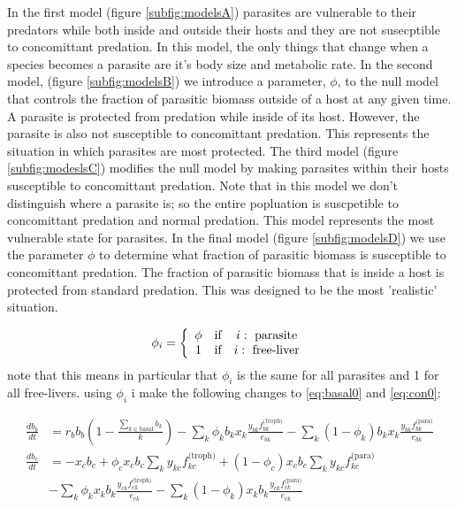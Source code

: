 \documentclass[11pt]{amsart}
\begin{document}
In the first model (figure \ref{subfig:modelsA}) parasites are vulnerable to their predators while both inside and outside their hosts and they are not susecptible to concomittant predation.  In this model, the only things that change when a species becomes a parasite are it's body size and metabolic rate.  In the second model, (figure \ref{subfig:modelsB})  we introduce a parameter, $\phi$, to the null model that controls the fraction of parasitic biomass outside of a host at any given time.  A parasite is protected from predation while inside of its host.  However, the parasite is also not susceptible to concomittant predation.  This represents the situation in which parasites are most protected.  The third model (figure \ref{subfig:modeslsC}) modifies the null model by making parasites within their hosts susceptible to concomittant predation.  Note that in this model we don't distinguish where a parasite is; so the entire popluation is suscpetible to concomittant predation and normal predation.  This model represents the most vulnerable state for parasites.  In the final model (figure \ref{subfig:modelsD}) we use the parameter $\phi$ to determine what fraction of parasitic biomass is susceptible to concomittant predation.  The fraction of parasitic biomass that is inside a host is protected from standard predation.  This was designed to be the most 'realistic' situation.


\begin{equation}
\phi_i = 
\left\{
\begin{array}{c c c}
\phi & \text{if} & i:\text{ parasite}\\
1 & \text{if} & i:\text{ free-liver}\\
\end{array}
\right.\label{phidef}
\end{equation}
note that this means in particular that $\phi_i$ is the same for all parasites and 1 for all free-livers.  using $\phi_i$  i make the following changes to \eqref{eq:basal0} and \eqref{eq:con0}:

\begin{align}
\frac{db_{b}}{dt} &= r_bb_b\left(1-\frac{\sum_{k\in\text{basal}}b_k}{k}\right) - \sum_k\phi_kb_kx_k\frac{y_{bk}f_{bk}^\text{(troph)}}{e_{bk}} - \sum_k(1-\phi_k)b_kx_k\frac{y_{bk}f^\text{(para)}_{bk}}{e_{bk}}\label{basaleq1} \\ 
\frac{db_{c}}{dt} &= -x_cb_c + \phi_cx_cb_c\sum_ky_{kc}f^\text{(troph)}_{kc} + (1-\phi_c)x_cb_c\sum_ky_{kc}f^\text{(para)}_{kc} \label{coneq1}\\ 
&- \sum_k \phi_kx_kb_k\frac{y_{ck}f^\text{(troph)}_{ck}}{e_{ck}} - \sum_k (1-\phi_k)x_kb_k\frac{y_{ck}f^\text{(para)}_{ck}}{e_{ck}}\nonumber
\end{align}
\end{document}
